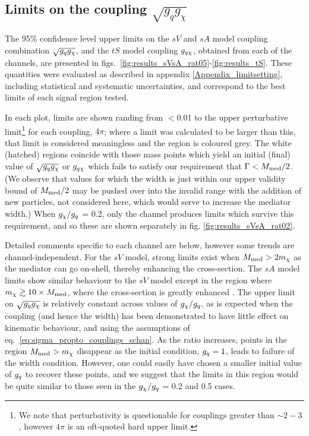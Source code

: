 \subsection{Limits on the coupling $\sqrt{g_{q}g_{\chi}}$}
The 95\% confidence level upper limits on the $sV$ and $sA$ model coupling combination $\sqrt{g_q g_{\chi}}$, and the $tS$ model coupling $g_{q \chi}$, obtained from each of the \monoX channels, are presented in figs.~\ref{fig:results_sVsA_rat05}-\ref{fig:results_tS}. These quantities were evaluated as described in appendix \ref{Appendix_limitsetting}, including statistical and systematic uncertainties, and correspond to the best limits of each signal region tested.

In each plot, limits are shown randing from $<$0.01 to the upper perturbative limit\footnote{We note that perturbativity is questionable for couplings greater than $\sim 2-3$, however $4\pi$ is an oft-quoted hard upper limit.} for each coupling, $4\pi$; where a limit was calculated to be larger than this, that limit is considered meaningless and the region is coloured grey. The white (hatched) regions coincide with those mass points which yield an initial (final) value of $\sqrt{g_q g_{\chi}}$ or $g_{q \chi}$ which fails to satisfy our requirement that $\Gamma < M_{\mathrm{med}} / 2$. (We observe that values for which the width is just within our upper validity bound of $M_{\mathrm{med}}/2$ may be pushed over into the invalid range with the addition of new particles, not considered here, which would serve to increase the mediator width.) When $g_{\chi} / g_q$ = 0.2, only the \monojet channel produces limits which survive this requirement, and so these are shown separately in fig. \ref{fig:results_sVsA_rat02}.

Detailed comments specific to each channel are below, however some trends are channel-independent. For the $sV$ model, strong limits exist when $M_{\mathrm{med}} > 2 m_{\chi}$ as the mediator can go on-shell, thereby enhancing the cross-section. The $sA$ model limits show similar behaviour to the $sV$ model except in the region where $m_{\chi} \gtrsim 10 \times M_{\mathrm{med}}$, where the cross-section is greatly enhanced . The upper limit on $\sqrt{g_q g_{\chi}}$ is relatively constant across values of $g_{\chi} / g_q$, as is expected when the coupling (and hence the width) has been demonstrated to have little effect on kinematic behaviour, and using the assumptions of eq.~\ref{eq:sigma_propto_couplings_schan}. As the ratio increases, points in the region $M_{\mathrm{med}} > m_{\chi}$ disappear as the initial condition, $g_q = 1$, leads to failure of the width condition. However, one could easily have chosen a smaller initial value of $g_q$ to recover these points, and we suggest that the limits in this region would be quite similar to those seen in the $g_{\chi} / g_q$ = 0.2 and 0.5 cases.

